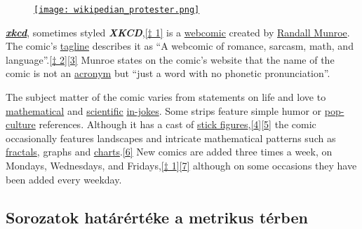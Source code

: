 \documentclass[]{scrartcl}
\newenvironment{ajanlofig}{\begin{figure}\begin{center}}{
\end{center}\end{figure}}
\newenvironment{ajanlo}{\begin{samepage}}{\end{samepage}}
\begin{document}
\begin{ajanlo}

\begin{ajanlofig}

\href{https://xkcd.com}{\texttt{[image: wikipedian\_protester.png]}}

\end{ajanlofig}

\textbf{\emph{\href{https://xkcd.com/}{xkcd}}}, sometimes styled
\textbf{\emph{XKCD}},\href{https://en.wikipedia.org/wiki/Xkcd\#cite_note-aboutxkcd-3}{{[}‡
1{]}} is a \href{https://en.wikipedia.org/wiki/Webcomic}{webcomic}
created by \href{https://en.wikipedia.org/wiki/Randall_Munroe}{Randall
Munroe}. The comic's
\href{https://en.wikipedia.org/wiki/Tagline}{tagline} describes it as
``A webcomic of romance, sarcasm, math, and
language''.\href{https://en.wikipedia.org/wiki/Xkcd\#cite_note-4}{{[}‡
2{]}}\href{https://en.wikipedia.org/wiki/Xkcd\#cite_note-Boston.com-5}{{[}3{]}}
Munroe states on the comic's website that the name of the comic is not
an \href{https://en.wikipedia.org/wiki/Acronym}{acronym} but ``just a
word with no phonetic pronunciation''.

The subject matter of the comic varies from statements on life and love
to \href{https://en.wikipedia.org/wiki/Mathematical_joke}{mathematical}
and \href{https://en.wikipedia.org/wiki/Science}{scientific}
\href{https://en.wikipedia.org/wiki/In-joke}{in-jokes}. Some strips
feature simple humor or
\href{https://en.wikipedia.org/wiki/Pop-culture}{pop-culture}
references. Although it has a cast of
\href{https://en.wikipedia.org/wiki/Stick_figures}{stick
figures},\href{https://en.wikipedia.org/wiki/Xkcd\#cite_note-Guzman-6}{{[}4{]}}\href{https://en.wikipedia.org/wiki/Xkcd\#cite_note-7}{{[}5{]}}
the comic occasionally features landscapes and intricate mathematical
patterns such as \href{https://en.wikipedia.org/wiki/Fractal}{fractals},
graphs and
\href{https://en.wikipedia.org/wiki/Chart}{charts}.\href{https://en.wikipedia.org/wiki/Xkcd\#cite_note-8}{{[}6{]}}
New comics are added three times a week, on Mondays, Wednesdays, and
Fridays,\href{https://en.wikipedia.org/wiki/Xkcd\#cite_note-aboutxkcd-3}{{[}‡
1{]}}\href{https://en.wikipedia.org/wiki/Xkcd\#cite_note-redhat-9}{{[}7{]}}
although on some occasions they have been added every weekday.

\end{ajanlo}

\subsection{Sorozatok határértéke a metrikus
térben}\label{sorozatok-hatarerteke-a-metrikus-terben}
\end{document}
